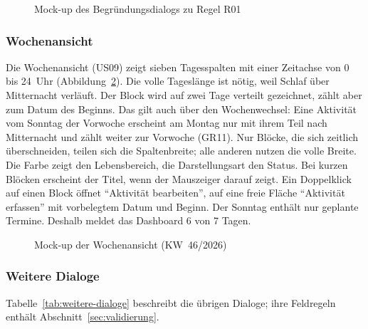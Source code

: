 \begin{figure}[H]
  \caption{Mock-up des Begründungsdialogs zu Regel R01}\label{abb:mockup-begruendung}
  \centering
\end{figure}

\subsubsection{Wochenansicht}\label{sec:dlg-woche}
Die Wochenansicht (US09) zeigt sieben Tagesspalten mit einer Zeitachse von 0 bis 24~Uhr (Abbildung~\ref{abb:mockup-woche}). Die volle Tageslänge ist nötig, weil Schlaf über Mitternacht verläuft. Der Block wird auf zwei Tage verteilt gezeichnet, zählt aber zum Datum des Beginns. Das gilt auch über den Wochenwechsel: Eine Aktivität vom Sonntag der Vorwoche erscheint am Montag nur mit ihrem Teil nach Mitternacht und zählt weiter zur Vorwoche (GR11). Nur Blöcke, die sich zeitlich überschneiden, teilen sich die Spaltenbreite; alle anderen nutzen die volle Breite. Die Farbe zeigt den Lebensbereich, die Darstellungsart den Status. Bei kurzen Blöcken erscheint der Titel, wenn der Mauszeiger darauf zeigt. Ein Doppelklick auf einen Block öffnet \enquote{Aktivität bearbeiten}, auf eine freie Fläche \enquote{Aktivität erfassen} mit vorbelegtem Datum und Beginn. Der Sonntag enthält nur geplante Termine. Deshalb meldet das Dashboard 6 von 7 Tagen.

\begin{figure}[H]
  \caption{Mock-up der Wochenansicht (\ac{KW}~46/2026)}\label{abb:mockup-woche}
  \centering
\end{figure}

\subsubsection{Weitere Dialoge}\label{sec:dlg-weitere}
Tabelle~\ref{tab:weitere-dialoge} beschreibt die übrigen Dialoge; ihre Feldregeln enthält Abschnitt~\ref{sec:validierung}.


